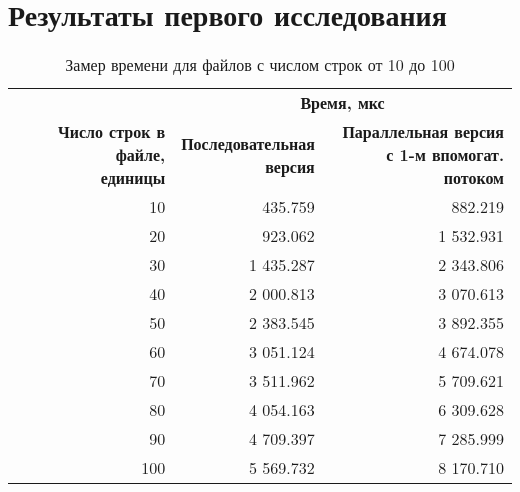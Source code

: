 \clearpage

\section*{Результаты первого исследования}

\begin{table}[ht]
	\small
	\begin{center}
		\begin{threeparttable}
			\caption{Замер времени для файлов с числом строк от 10 до 100}
			\label{tbl:time}
			\begin{tabular}{|r|r|r|}
				\hline
				& \multicolumn{2}{c|}{\bfseries Время, мкс} \\ \cline{2-3}
				\bfseries \makecell{Число строк в файле, \\ единицы} & \bfseries \makecell{Последовательная \\ версия} & \bfseries \makecell{Параллельная версия \\ с 1-м впомогат. потоком} \\ \cline{2-3}
				\hline
				10 & 435.759 & 882.219  \\
				\hline
				20 & 923.062 & 1 532.931 \\
				\hline
				30 & 1 435.287 & 2 343.806  \\
				\hline
				40 & 2 000.813 & 3 070.613 \\
				\hline
				50 & 2 383.545 & 3 892.355  \\
				\hline
				60 & 3 051.124 & 4 674.078  \\
				\hline
				70 & 3 511.962 & 5 709.621  \\
				\hline
				80 & 4 054.163 & 6 309.628  \\
				\hline
				90 & 4 709.397 & 7 285.999  \\
				\hline
				100 & 5 569.732 & 8 170.710  \\
				\hline
			\end{tabular}	
		\end{threeparttable}
	\end{center}
\end{table}

\clearpage


